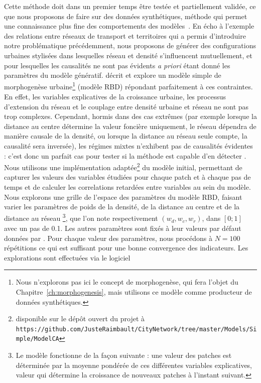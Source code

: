 {}{
Cette méthode doit dans un premier temps être testée et partiellement validée, ce que nous proposons de faire sur des données synthétiques, méthode qui permet une connaissance plus fine des comportements des modèles~\cite{raimbault2016generation}. En écho à l'exemple des relations entre réseaux de transport et territoires qui a permis d'introduire notre problématique précédemment, nous proposons de générer des configurations urbaines stylisées dans lesquelles réseau et densité s'influencent mutuellement, et pour lesquelles les causalités ne sont pas évidents \emph{a priori} étant donné les paramètres du modèle génératif. \cite{raimbault2014hybrid} décrit et explore un modèle simple de morphogenèse urbaine\footnote{Nous n'explorons pas ici le concept de morphogenèse, qui fera l'objet du Chapitre~\ref{ch:morphogenesis}, mais utilisons ce modèle comme producteur de données synthétiques.} (modèle RBD) répondant parfaitement à ces contraintes. En effet, les variables explicatives de la croissance urbaine, les processus d'extension du réseau et le couplage entre densité urbaine et réseau ne sont pas trop complexes. Cependant, hormis dans des cas extrêmes (par exemple lorsque la distance au centre détermine la valeur foncière uniquement, le réseau dépendra de manière causale de la densité, ou lorsque la distance au réseau seule compte, la causalité sera inversée), les régimes mixtes n'exhibent   pas de causalités évidentes : c'est donc un parfait cas pour tester si la méthode est capable d'en détecter  . Nous utilisons une implémentation adaptée\footnote{disponible sur le dépôt ouvert du projet à\\\texttt{https://github.com/JusteRaimbault/CityNetwork/tree/master/Models/Simple/ModelCA}} du modèle initial, permettant de capturer les valeurs des variables étudiées pour chaque patch et à chaque pas de temps et de calculer les correlations retardées entre variables au sein du modèle. Nous explorons une grille de l'espace des paramètres du modèle RBD, faisant varier les paramètres de poids de la densité, de la distance au centre et de la distance au réseau  \footnote{Le modèle fonctionne de la façon suivante : une valeur des patches est déterminée par la moyenne pondérée de ces différentes variables explicatives, valeur qui détermine la croissance de nouveaux patches à l'instant suivant.}, que l'on note respectivement $(w_{d},w_{c},w_{r})$, dans $\left[0;1\right]$ avec un pas de 0.1. Les autres paramètres sont fixés à leur valeurs par défaut données par \cite{raimbault2014hybrid}. Pour chaque valeur des paramètres, nous procédons à $N=100$ répétitions ce qui est suffisant pour une bonne convergence des indicateurs. Les explorations sont effectuées via le logiciel }
